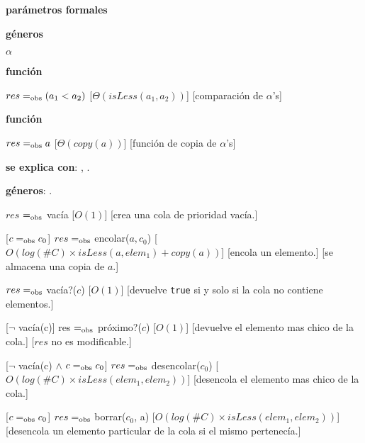 \begin{Interfaz}

	\textbf{parámetros formales}\parindent\\
	\parbox{1.7cm}{\textbf{géneros}}$\alpha$\\
	\parbox[t]{1.7cm}{\textbf{función}}\parbox[t]{.5\textwidth-\parindent-1.7cm}{
		{$res =_{\mathrm{obs}} (a_1 < a_2)$}
		[$\Theta(isLess(a_1, a_2))$]
		[comparación de $\alpha$'s]
	}
	\parbox[t]{1.7cm}{\textbf{función}}\parbox[t]{.5\textwidth-\parindent-1.7cm}{
		{$res =_{\mathrm{obs}} a$}
		[$\Theta(copy(a))$]
		[función de copia de $\alpha$'s]
	}

	\textbf{se explica con}: , .

	\textbf{géneros}: .


	{$res$ $=_{\mathrm{obs}}$ vacía}
	[$O(1)$]
	[crea una cola de prioridad vacía.]

	[$c =_{\mathrm{obs}} c_0$]
	{$res =_{\mathrm{obs}}$ encolar($a, c_0$)}
	[$O(log(\#C) \times isLess(a, elem_1) + copy(a))$]
	[encola un elemento.]
	[se almacena una copia de $a$.]

	{$res =_{\mathrm{obs}}$ vacía?($c$)}
	[$O(1)$]
	[devuelve \texttt{true} si y solo si la cola no contiene elementos.]

	[$\neg$ vacía(c)]
	{res $=_{\mathrm{obs}}$ próximo?($c$)}
	[$O(1)$]
	[devuelve el elemento mas chico de la cola.]
	[$res$ no es modificable.]

	[$\neg$ vacía(c) $\land$ $c =_{\mathrm{obs}} c_0$]
	{$res =_{\mathrm{obs}}$ desencolar($c_0$)}
	[$O(log(\#C) \times isLess(elem_1, elem_2))$]
	[desencola el elemento mas chico de la cola.]

	[$c =_{\mathrm{obs}} c_0$]
	{$res =_{\mathrm{obs}}$ borrar($c_0$, a)}
	[$O(log(\#C) \times isLess(elem_1, elem_2))$]
	[desencola un elemento particular de la cola si el mismo pertenecía.]



\end{Interfaz}
